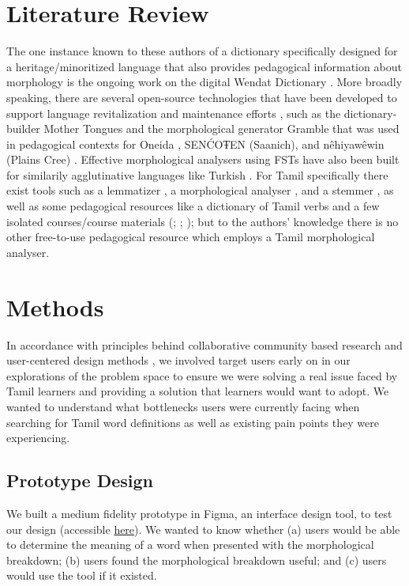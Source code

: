 \documentclass[11pt]{article}
\begin{document}
\section{Literature Review}
The one instance known to these authors of a dictionary specifically designed for a heritage/minoritized 
language that also provides pedagogical information about morphology is the ongoing work on the 
digital Wendat Dictionary \citep{lukaniec_modern_2023}. 
More broadly speaking, there are several open-source technologies that have been developed to 
support language revitalization and maintenance efforts \citep{brinklow_indigenous_nodate}, 
such as the dictionary-builder Mother Tongues \citep{littell_waldayu_2017} and the 
morphological generator Gramble \citep{littell_gramble_2024} that was used in pedagogical contexts for Oneida \citep{lu-etal-2024-empowering}, SEN\'CO\foreignlanguage{danish}{Ŧ}EN (Saanich), and n\^ehiyaw\^ewin (Plains Cree) \citep{pine_speech_2025}. Effective morphological analysers using FSTs have also been built for similarily agglutinative languages like Turkish \citep{yildiz-etal-2019-open}.
For Tamil specifically there exist tools such as a lemmatizer \citep{qi2020stanza}, 
a morphological analyser \citep{sarveswaran_thamizhimorph_2021},  and a stemmer \citep{rajalingam_rdamodharantamil-stemmer_2025}, as well as some 
pedagogical resources like a dictionary of Tamil verbs \citep{schiffman_english_2009} and a few 
isolated courses/course materials (\citealp{annamalai_colloquial_2002}; \citealp{prasad_tamil_2025}; \citealp{cheran_learn_2001}); 
but to the authors' knowledge there is no other free-to-use pedagogical resource which employs a Tamil morphological analyser.

\section{Methods}
In accordance with principles behind collaborative community based research \citep{bucholtz_community-centered_2021} and user-centered design methods \citep{wallisch_overcoming_2019}, 
we involved target users early on in our explorations of the problem space to ensure we were solving a real issue faced by Tamil learners and providing a solution that learners would want to adopt. 
We wanted to understand what bottlenecks users were currently facing when searching for Tamil word definitions as well as existing pain points they were experiencing. 

\subsection{Prototype Design}
We built a medium fidelity prototype in Figma, an interface design tool, to test our design (accessible \href{https://www.figma.com/proto/1tpcdO49QkVfDOQYSrZ5YH/Tamil-Dict-Design-updated?node-id=5-288&starting-point-node-id=5%3A288&t=XY9IO1vT16vxJg0e-1}{here}). 
We wanted to know whether (a) users would be able to determine the meaning 
of a word when presented with the morphological breakdown; (b) users found the morphological breakdown useful; and 
(c) users would use the tool if it existed.
\end{document}
